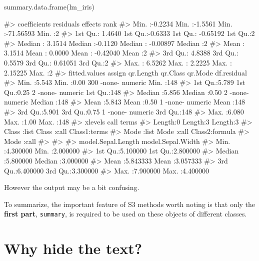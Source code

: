 \begin{Schunk}
\begin{Sinput}
summary.data.frame(lm_iris)
\end{Sinput}
\begin{Soutput}
#>   coefficients       residuals          effects               rank  
#>  Min.   :-0.2234   Min.   :-1.5561   Min.   :-71.56593   Min.   :2  
#>  1st Qu.: 1.4640   1st Qu.:-0.6333   1st Qu.: -0.65192   1st Qu.:2  
#>  Median : 3.1514   Median :-0.1120   Median : -0.00897   Median :2  
#>  Mean   : 3.1514   Mean   : 0.0000   Mean   : -0.42040   Mean   :2  
#>  3rd Qu.: 4.8388   3rd Qu.: 0.5579   3rd Qu.:  0.61051   3rd Qu.:2  
#>  Max.   : 6.5262   Max.   : 2.2225   Max.   :  2.15225   Max.   :2  
#>  fitted.values       assign     qr.Length  qr.Class  qr.Mode  df.residual 
#>  Min.   :5.543   Min.   :0.00   300      -none-   numeric    Min.   :148  
#>  1st Qu.:5.789   1st Qu.:0.25     2      -none-   numeric    1st Qu.:148  
#>  Median :5.856   Median :0.50     2      -none-   numeric    Median :148  
#>  Mean   :5.843   Mean   :0.50     1      -none-   numeric    Mean   :148  
#>  3rd Qu.:5.901   3rd Qu.:0.75     1      -none-   numeric    3rd Qu.:148  
#>  Max.   :6.080   Max.   :1.00                                Max.   :148  
#>    xlevels         call         terms        
#>  Length:0      Length:3      Length:3        
#>  Class :list   Class :call   Class1:terms    
#>  Mode  :list   Mode  :call   Class2:formula  
#>                              Mode  :call     
#>                                              
#>                                              
#>  model.Sepal.Length  model.Sepal.Width 
#>  Min.   :4.300000    Min.   :2.000000  
#>  1st Qu.:5.100000    1st Qu.:2.800000  
#>  Median :5.800000    Median :3.000000  
#>  Mean   :5.843333    Mean   :3.057333  
#>  3rd Qu.:6.400000    3rd Qu.:3.300000  
#>  Max.   :7.900000    Max.   :4.400000
\end{Soutput}
\end{Schunk}

However the output may be a bit confusing.

To summarize, the important feature of S3 methods worth noting is that
only the \textbf{first part}, \texttt{summary}, is required to be used
on these objects of different classes.

\section{Why hide the text?}\label{why-hide-the-text}

